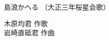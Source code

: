 \documentclass[10pt,b5j]{tarticle} %
\begin{document}
\begin{minipage}[c]{0.7\hsize} %
    \begin{center}
        {\LARGE
            島浪かへる %
        }
        {\small 
            （大正三年桜星会歌） %
        }
    \end{center}
\end{minipage}
\begin{minipage}[c]{0.3\hsize} %
    \begin{flushright} %
        木原均君 作歌\\岩崎直砥君 作曲 %
    \end{flushright}
\end{minipage}
\end{document}
